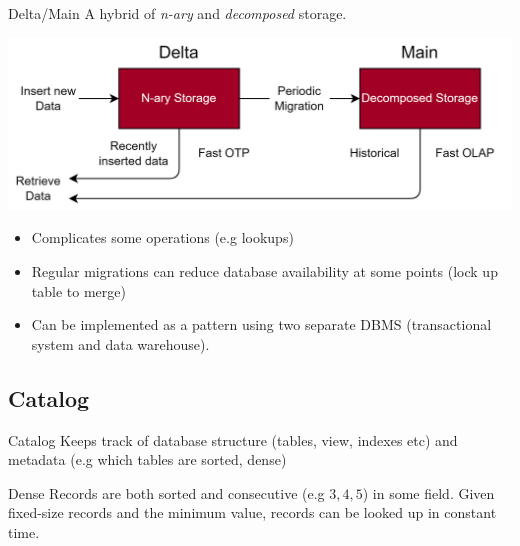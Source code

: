 \begin{definitionbox}{Delta/Main}
    A hybrid of \textit{n-ary} and \textit{decomposed} storage.
    \begin{center}
        \includegraphics[width=.8\textwidth]{storage/images/delta_main.drawio.png}
    \end{center}
    \begin{itemize}
        \item Complicates some operations (e.g lookups)
        \item Regular migrations can reduce database availability at some points (lock up table to merge)
        \item Can be implemented as a pattern using two separate DBMS (transactional system and data warehouse).
    \end{itemize}
\end{definitionbox}


\subsection{Catalog}
\begin{definitionbox}{Catalog}
    Keeps track of database structure (tables, view, indexes etc) and metadata (e.g which tables are sorted, dense)
\end{definitionbox}

\begin{definitionbox}{Dense}
    Records are both sorted and consecutive (e.g $3,4,5$) in some field. Given fixed-size records and the minimum value, records can be looked up in constant time.
\end{definitionbox}

